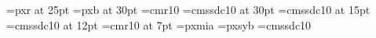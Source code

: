 \font\titoloCap=pxr at 25pt
\font\titoloCapUno=pxb at 30pt
\font{}=cmr10
\font\capitolofont=cmssdc10 at 30pt
\font\sezionefont=cmssdc10 at 15pt
\font\sottosezionefont=cmssdc10 at 12pt
\font\footnotefont=cmr10 at 7pt
\font\Gotico=pxmia%
\font\Gruppi=pxsyb%
\font\algoritmoFont=cmssdc10
